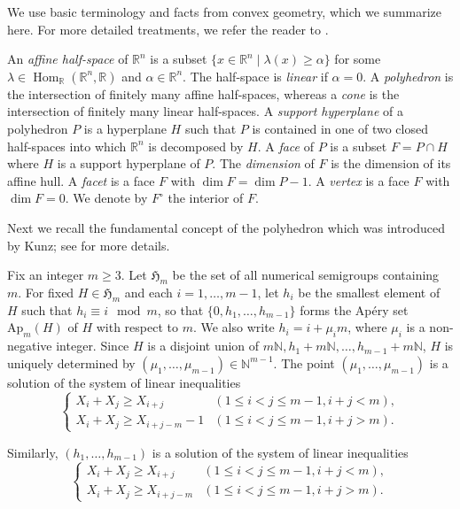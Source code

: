 \documentclass{amsart}
\DeclareMathOperator{\Hom}{Hom}
\theoremstyle{plain}
\theoremstyle{definition}
\numberwithin{theorem}{section}
\numberwithin{equation}{section}
\numberwithin{equation}{theorem}
\begin{document}
We use basic terminology and facts from convex geometry, which we summarize here.
For more detailed treatments, we refer the reader to \cite{BG}. 

An \emph{affine half-space} of $\mathbb{R}^n$ is a subset $\{x\in \mathbb{R}^n \mid \lambda(x)\ge \alpha\}$ for some $\lambda \in \Hom_{\mathbb{R}}(\mathbb{R}^n,\mathbb{R})$ and $\alpha\in \mathbb{R}^n$.
The half-space is \emph{linear} if $\alpha=0$.
A \emph{polyhedron} is the intersection of finitely many affine half-spaces, whereas a \emph{cone} is the intersection of finitely many linear half-spaces.
A \emph{support hyperplane} of a polyhedron $P$ is a hyperplane $H$ such that $P$ is contained in one of two closed half-spaces into which $\mathbb{R}^n$ is decomposed by $H$.
A \emph{face} of $P$ is a subset $F=P\cap H$ where $H$ is a support hyperplane of $P$.
The \emph{dimension} of $F$ is the dimension of its affine hull.
A \emph{facet} is a face $F$ with $\dim F=\dim P-1$.
A \emph{vertex} is a face $F$ with $\dim F=0$.
We denote by $F^{\circ}$ the interior of $F$.

Next we recall the fundamental concept of the polyhedron which was introduced by Kunz; see \cite{K} for more details.

Fix an integer $m \ge 3$.
Let $\mathfrak{H}_m$ be the set of all numerical semigroups containing $m$.
For fixed $H\in \mathfrak{H}_m$ and each $i=1,\dots,m-1$, let $h_i$ be the smallest element of $H$ such that $h_i \equiv i \mod m$, so that $\{0,h_1,\dots,h_{m-1}\}$ forms the Ap\'ery set $\mathrm{Ap}_m(H)$ of $H$ with respect to $m$.
We also write $h_i=i+\mu_im$, where $\mu_i$ is a non-negative integer.
Since $H$ is a disjoint union of $m\mathbb{N},h_1+m\mathbb{N},\dots, h_{m-1}+m\mathbb{N}$, $H$ is uniquely determined by
$(\mu_1,\dots,\mu_{m-1}) \in \mathbb{N}^{m-1}$.
The point $(\mu_1,\dots,\mu_{m-1})$ is a solution of the system of linear inequalities
\begin{equation} \label{ieq}
\left\{\begin{array}{ll}
X_i+X_j \ge X_{i+j} & (1 \le i < j \le m-1, i+j<m),\\
X_i+X_j \ge X_{i+j-m}-1 & (1 \le i < j \le m-1, i+j>m).
\end{array}\right.
\end{equation}

Similarly, $(h_1,\dots,h_{m-1})$ is a solution of the system of linear inequalities
\begin{equation} \label{ieqq}
\left\{\begin{array}{ll}
X_i+X_j \ge X_{i+j} & (1 \le i < j \le m-1, i+j<m),\\
X_i+X_j \ge X_{i+j-m} & (1 \le i < j \le m-1, i+j>m).
\end{array}\right.
\end{equation}
\end{document}
